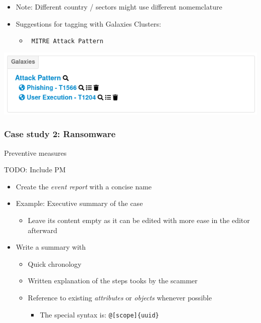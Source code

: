 \begin{frame}
    \begin{itemize}
        \item Note: Different country / sectors might use different nomemclature
        \item Suggestions for tagging with Galaxies Clusters:
        \begin{itemize}
            \item \texttt{\color{black} MITRE Attack Pattern}
        \end{itemize}
    \end{itemize}
    \vspace{1cm}
    \includegraphics[width=1.0\linewidth]{pictures/case1/event-clusters.png}
\end{frame}

\begin{frame}
    \frametitle{Case study 2: Ransomware}
    Preventive measures
    \begin{center}
        TODO: Include PM
    \end{center}
\end{frame}

\begin{frame}
    \begin{itemize}
        \item Create the \textit{event report} with a concise name
        \item Example: Executive summary of the case
        \begin{itemize}
            \item Leave its content empty as it can be edited with more ease in the editor afterward
        \end{itemize}
        \item Write a summary with
        \begin{itemize}
            \item Quick chronology
            \item Written explanation of the steps tooks by the scammer
            \item Reference to existing \textit{attributes} or \textit{objects} whenever possible
            \begin{itemize}
                \item The special syntax is: \texttt{@[scope]\{uuid\}}
            \end{itemize}
        \end{itemize}
    \end{itemize}
\end{frame}

